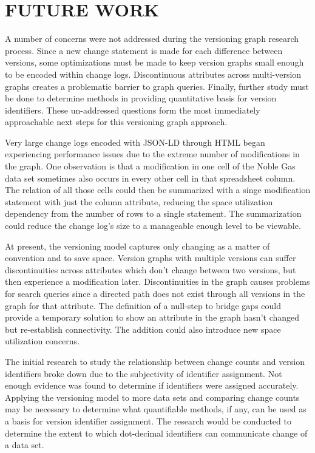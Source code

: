 
\chapter{FUTURE WORK}\label{ch:future}

A number of concerns were not addressed during the versioning graph research process.
Since a new change statement is made for each difference between versions, some optimizations must be made to keep version graphs small enough to be encoded within change logs.
Discontinuous attributes across multi-version graphs creates a problematic barrier to graph queries.
Finally, further study must be done to determine methods in providing quantitative basis for version identifiers.
These un-addressed questions form the most immediately approachable next steps for this versioning graph approach.

Very large change logs encoded with JSON-LD through HTML began experiencing performance issues due to the extreme number of modifications in the graph.
One observation is that a modification in one cell of the Noble Gas data set sometimes also occurs in every other cell in that spreadsheet column.
The relation of all those cells could then be summarized with a singe modification statement with just the column attribute, reducing the space utilization dependency from the number of rows to a single statement.
The summarization could reduce the change log's size to a manageable enough level to be viewable.

At present, the versioning model captures only changing as a matter of convention and to save space.
Version graphs with multiple versions can suffer discontinuities across attributes which don't change between two versions, but then experience a modification later.
Discontinuities in the graph causes problems for search queries since a directed path does not exist through all versions in the graph for that attribute.
The definition of a null-step to bridge gaps could provide a temporary solution to show an attribute in the graph hasn't changed but re-establish connectivity.
The addition could also introduce new space utilization concerns.

The initial research to study the relationship between change counts and version identifiers broke down due to the subjectivity of identifier assignment.
Not enough evidence was found to determine if identifiers were assigned accurately.
Applying the versioning model to more data sets and comparing change counts may be necessary to determine what quantifiable methods, if any, can be used as a basis for version identifier assignment.
The research would be conducted to determine the extent to which dot-decimal identifiers can communicate change of a data set.

